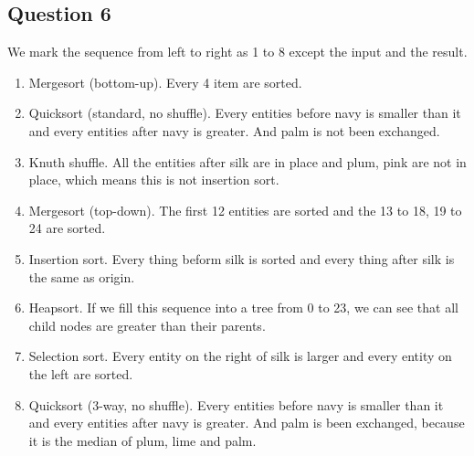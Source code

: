 \documentclass[conference]{IEEEtran}
\begin{document}
\subsection*{Question 6}
We mark the sequence from left to right as 1 to 8 except the input and the result.
\begin{enumerate}[1]
    \item Mergesort (bottom-up). Every 4 item are sorted.
    \item Quicksort (standard, no shuffle). Every entities before navy is smaller than it and every entities after navy is greater. And palm is not been exchanged.
    \item Knuth shuffle. All the entities after silk are in place and plum, pink are not in place, which means this is not insertion sort.
    \item Mergesort (top-down). The first 12 entities are sorted and the 13 to 18, 19 to 24 are sorted.
    \item Insertion sort. Every thing beform silk is sorted and every thing after silk is the same as origin.
    \item Heapsort. If we fill this sequence into a tree from 0 to 23, we can see that all child nodes are greater than their parents.
    \item Selection sort. Every entity on the right of silk is larger and every entity on the left are sorted.
    \item Quicksort (3-way, no shuffle). Every entities before navy is smaller than it and every entities after navy is greater. And palm is been exchanged, because it is the median of plum, lime and palm.
\end{enumerate}
\end{document}
